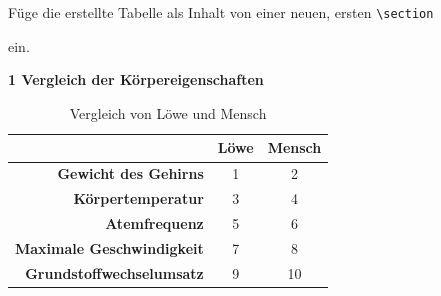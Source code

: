 \begin{frame}[fragile]
	\Aufgabee
		Füge die erstellte Tabelle als Inhalt von einer neuen, ersten \lstinline[basicstyle=\normalfont\ttfamily\normalsize]|\section|
        
        \textrm{}
        
        ein.
	\begin{outputbox}
		{\LARGE \textbf{1 Vergleich der Körpereigenschaften}}
		\vspace{-0.3cm}
		\begin{center}
            \begin{table}[htbp] 
                \centering
            	\caption{Vergleich von Löwe und Mensch}
                \vspace{-0.4cm}
            	\begin{tabular}{|r|c|c|}
            		\hline 
            		\textbf{}                         & \textbf{Löwe} & \textbf{Mensch}  \\ \hline 
            		\textbf{Gewicht des Gehirns}      & 1             & 2                \\ \hline 
            		\textbf{Körpertemperatur}         & 3             & 4                \\ \hline 
            		\textbf{Atemfrequenz}             & 5             & 6                \\ \hline 
            		\textbf{Maximale Geschwindigkeit} & 7             & 8                \\ \hline 
            		\textbf{Grundstoffwechselumsatz}  & 9             & 10               \\ \hline
            	\end{tabular} 
            	\label{}
            \end{table}
		\end{center}
	\end{outputbox}

\end{frame}
